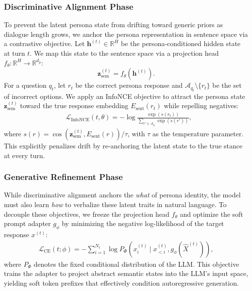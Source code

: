\subsubsection{Discriminative Alignment Phase}
To prevent the latent persona state from drifting toward generic priors as dialogue length grows, we anchor the persona representation in sentence space via a contrastive objective.
Let $\mathbf{h}^{(t)} \in \mathbb{R}^H$ be the persona-conditioned hidden state at turn $t$. We map this state to the sentence space via a projection head $f_\theta: \mathbb{R}^H \to \mathbb{R}^{d_p}$:
\begin{equation}
    \mathbf{z}^{(t)}_{\text{sem}} = f_\theta(\mathbf{h}^{(t)}).
\end{equation}
For a question $q_t$, let $r_t$ be the correct persona response and $\mathcal{A}_{q_t} \setminus \{r_t\}$ be the set of incorrect options. We apply an InfoNCE objective to attract the persona state $\mathbf{z}^{(t)}_{\text{sem}}$ toward the true response embedding $E_{\text{sent}}(r_t)$ while repelling negatives:
\begin{equation}
\label{eq:disc-infonce}
\begin{split}
    &\mathcal{L}_{\text{InfoNCE}}(t, \theta) = - \log \frac{\exp(s(r_t))}{\sum_{r' \in \mathcal{A}_{q_t}} \exp(s(r'))}, 
\end{split}
\end{equation}
where $s(r) = \cos(\mathbf{z}^{(t)}_{\text{sem}}, E_{\text{sent}}(r)) / \tau$, with $\tau$ as the temperature parameter. This explicitly penalizes drift by re-anchoring the latent state to the true stance at every turn.




\subsubsection{Generative Refinement Phase}
While discriminative alignment anchors the \textit{what} of persona identity, the model must also learn \textit{how} to verbalize these latent traits in natural language.
To decouple these objectives, we freeze the projection head $f_\theta$ and optimize the soft prompt adapter $g_\phi$ by minimizing the negative log-likelihood of the target response $x^{(t)}$:
\begin{equation}
\label{eq:disc-ce}
\begin{split}
    \mathcal{L}_{\text{CE}}(t; \phi) = - \sum_{i=1}^{N_t} \log P_\Phi(x_i^{(t)} \mid x_{<i}^{(t)}, g_\phi(\hat{X}^{(t)})),
\end{split}
\end{equation}
where $P_\Phi$ denotes the fixed conditional distribution of the LLM. This objective trains the adapter to project abstract semantic states into the LLM's input space, yielding soft token prefixes that effectively condition autoregressive generation.



